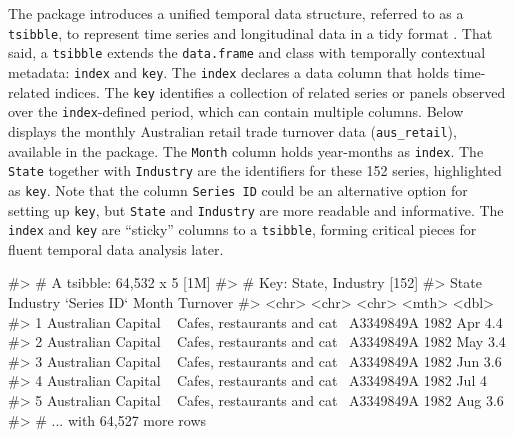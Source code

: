 The  package \citep{wang2020tsibble} introduces a
unified temporal data structure, referred to as a \texttt{tsibble}, to
represent time series and longitudinal data in a tidy format
\citep{wickham2014tidy}. That said, a \texttt{tsibble} extends the
\texttt{data.frame} and  class with temporally
contextual metadata: \texttt{index} and \texttt{key}. The \texttt{index}
declares a data column that holds time-related indices. The \texttt{key}
identifies a collection of related series or panels observed over the
\texttt{index}-defined period, which can contain multiple columns. Below
displays the monthly Australian retail trade turnover data
(\texttt{aus\_retail}), available in the  package.
The \texttt{Month} column holds year-months as \texttt{index}. The
\texttt{State} together with \texttt{Industry} are the identifiers for
these 152 series, highlighted as \texttt{key}. Note that the column
\texttt{Series\ ID} could be an alternative option for setting up
\texttt{key}, but \texttt{State} and \texttt{Industry} are more readable
and informative. The \texttt{index} and \texttt{key} are ``sticky''
columns to a \texttt{tsibble}, forming critical pieces for fluent
temporal data analysis later.

\begin{Schunk}
\begin{Soutput}
#> # A tsibble: 64,532 x 5 [1M]
#> # Key:       State, Industry [152]
#>   State                Industry                    `Series ID`    Month Turnover
#>   <chr>                <chr>                       <chr>          <mth>    <dbl>
#> 1 Australian Capital ~ Cafes, restaurants and cat~ A3349849A   1982 Apr      4.4
#> 2 Australian Capital ~ Cafes, restaurants and cat~ A3349849A   1982 May      3.4
#> 3 Australian Capital ~ Cafes, restaurants and cat~ A3349849A   1982 Jun      3.6
#> 4 Australian Capital ~ Cafes, restaurants and cat~ A3349849A   1982 Jul      4  
#> 5 Australian Capital ~ Cafes, restaurants and cat~ A3349849A   1982 Aug      3.6
#> # ... with 64,527 more rows
\end{Soutput}
\end{Schunk}

